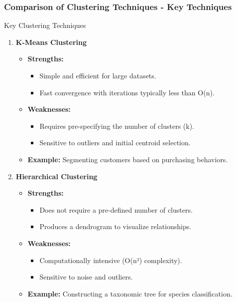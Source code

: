 \documentclass[aspectratio=169]{beamer}
\begin{document}
\begin{frame}[fragile]
    \frametitle{Comparison of Clustering Techniques - Key Techniques}
    \begin{block}{Key Clustering Techniques}
        \begin{enumerate}
            \item \textbf{K-Means Clustering}
            \begin{itemize}
                \item \textbf{Strengths:}
                    \begin{itemize}
                        \item Simple and efficient for large datasets.
                        \item Fast convergence with iterations typically less than O(n).
                    \end{itemize}
                \item \textbf{Weaknesses:}
                    \begin{itemize}
                        \item Requires pre-specifying the number of clusters (k).
                        \item Sensitive to outliers and initial centroid selection.
                    \end{itemize}
                \item \textbf{Example:} Segmenting customers based on purchasing behaviors.
            \end{itemize}

            \item \textbf{Hierarchical Clustering}
            \begin{itemize}
                \item \textbf{Strengths:} 
                    \begin{itemize}
                        \item Does not require a pre-defined number of clusters.
                        \item Produces a dendrogram to visualize relationships.
                    \end{itemize}
                \item \textbf{Weaknesses:} 
                    \begin{itemize}
                        \item Computationally intensive (O(n²) complexity).
                        \item Sensitive to noise and outliers.
                    \end{itemize}
                \item \textbf{Example:} Constructing a taxonomic tree for species classification.
            \end{itemize}
        \end{enumerate}
    \end{block}
\end{frame}
\end{document}

